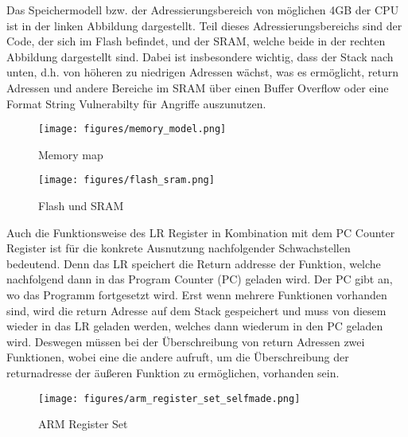 \documentclass[a4paper,
DIV=13,
12pt,
BCOR=10mm,
department=FakIM,
oneside,
parskip=half,
automark,
listof=totocnumbered,
bibliography=totocnumbered,
acronym=totocnumbered
] {OTHRartcl}
\begin{document}
Das Speichermodell bzw. der Adressierungsbereich von möglichen 4GB der CPU ist in der linken Abbildung dargestellt.
Teil dieses Adressierungsbereichs sind der Code, der sich im Flash befindet, und der SRAM, welche beide in der rechten Abbildung dargestellt sind.
Dabei ist insbesondere wichtig, dass der Stack nach unten, d.h. von höheren zu niedrigen Adressen wächst, was es ermöglicht,
return Adressen und andere Bereiche im SRAM über einen Buffer Overflow oder eine Format String Vulnerabilty für Angriffe auszunutzen.
\begin{figure}[ht!]
  \begin{minipage}[b]{.45\linewidth}
    \texttt{[image: figures/memory\_model.png]}
    \caption{Memory map}
    \label{Abbildung 1: Memory map}
  \end{minipage}
  \hspace{.1\linewidth}
  \begin{minipage}[b]{.48\linewidth}
    \texttt{[image: figures/flash\_sram.png]}
    \caption{Flash und SRAM}
    \label{Abbildung 6: Flash und SRAM}
  \end{minipage}
\end{figure}

Auch die Funktionsweise des LR Register in Kombination mit dem PC Counter Register ist für die konkrete Ausnutzung nachfolgender Schwachstellen bedeutend.
Denn das LR speichert die Return addresse der Funktion, welche nachfolgend dann in das Program Counter (PC) geladen wird. Der PC gibt an, wo das Programm fortgesetzt wird.
Erst wenn mehrere Funktionen vorhanden sind, wird die return Adresse auf dem Stack gespeichert und muss von
diesem wieder in das LR geladen werden, welches dann wiederum in den PC geladen wird.
Deswegen müssen bei der Überschreibung von return Adressen zwei Funktionen, wobei eine die andere aufruft, um die Überschreibung
der returnadresse der äußeren Funktion zu ermöglichen, vorhanden sein.

\begin{figure}[ht!]
\begin{center}
  \texttt{[image: figures/arm\_register\_set\_selfmade.png]}
  \caption{ARM Register Set}
  \label{Abbildung 1: ARM Register Set}
\end{center}
\end{figure}
\end{document}
